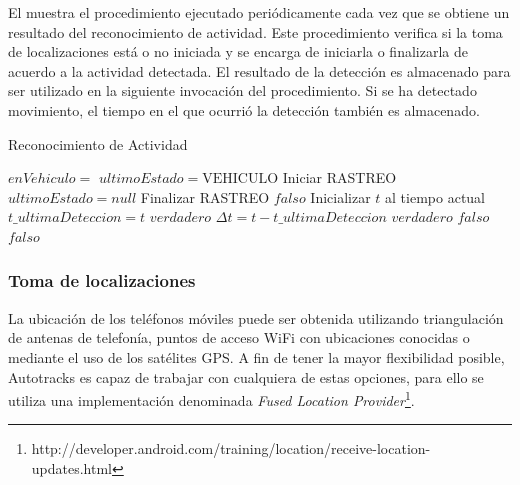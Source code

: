 El  muestra el procedimiento ejecutado periódicamente cada vez que se obtiene un resultado del reconocimiento de actividad. Este procedimiento verifica si la toma de localizaciones está o no iniciada y se encarga de iniciarla o finalizarla de acuerdo a la actividad detectada. El resultado de la detección es almacenado para ser utilizado en la siguiente invocación del procedimiento. Si se ha detectado movimiento, el tiempo en el que ocurrió la detección también es almacenado.
 
\begin{algorithm}
\caption{Reconocimiento de Actividad}
\label{alg:deteccion_actividad}
\begin{algorithmic}[1]
	\State $enVehiculo =$ 
		\State $ultimoEstado = \text{VEHICULO}$
			\State Iniciar RASTREO
		\EndIf
	\Else
		\State $ultimoEstado = null$
			\State Finalizar RASTREO
		\EndIf
	\EndIf
\EndProcedure
\Statex
{}
		\State \Return $falso$
	\Else
		\State Inicializar $t$ al tiempo actual
			\State $t\_ultimaDeteccion = t$ 
			\State \Return $verdadero$
		\Else
			\State $\Delta t = t - t\_ultimaDeteccion$
				\State \Return $verdadero$
			\Else
				\State \Return $falso$
			\EndIf
		\Else
			\State \Return $falso$
		\EndIf
		\EndIf
	\EndIf
\EndFunction
\end{algorithmic}
\end{algorithm}

\subsubsection{Toma de localizaciones}
\label{toma_localizaciones}

La ubicación de los teléfonos móviles puede ser obtenida utilizando triangulación de antenas de telefonía, puntos de acceso WiFi con ubicaciones conocidas o mediante el uso de los satélites GPS. A fin de tener la mayor flexibilidad posible, Autotracks es capaz de trabajar con cualquiera de estas opciones, para ello se utiliza una implementación denominada \emph{Fused Location Provider}\footnote{http://developer.android.com/training/location/receive-location-updates.html}.

